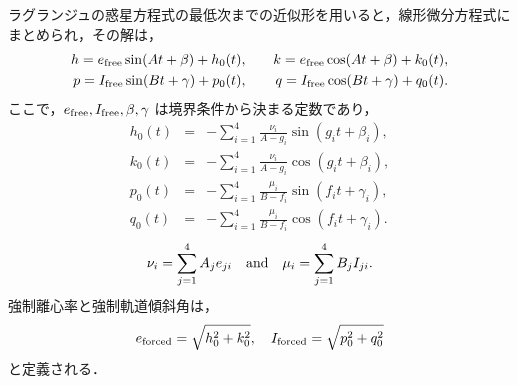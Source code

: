 \documentclass[11pt,a4paper,oneside,onecolumn]{jreport}
\begin{document}
ラグランジュの惑星方程式の最低次までの近似形を用いると，線形微分方程式にまとめられ，その解は，
\begin{eqnarray}
h = e_{\rm free} \sin (A t + \beta) + h_0 (t), & \quad & k = e_{\rm free} \cos (A t + \beta) + k_0 (t), \label{eq:hk_solution} \\
p = I_{\rm free} \sin (B t + \gamma) + p_0 (t), & \quad & q = I_{\rm free} \cos (B t + \gamma) + q_0 (t). \label{eq:pq_solution}
\end{eqnarray}
ここで，$e_{\rm free}, I_{\rm free}, \beta, \gamma$ は境界条件から決まる定数であり，
\begin{eqnarray}
h_0 (t) & = & - \sum_{i = 1}^4 \frac{\nu_i}{A - g_i} \sin (g_i t + \beta_i), \label{eq:h_0_4planet} \\
k_0 (t) & = & - \sum_{i = 1}^4 \frac{\nu_i}{A - g_i} \cos (g_i t + \beta_i), \label{eq:k_0_4planet} \\
p_0 (t) & = & - \sum_{i = 1}^4 \frac{\mu_i}{B - f_i} \sin (f_i t + \gamma_i), \label{eq:p_0_4planet} \\
q_0 (t) & = & - \sum_{i = 1}^4 \frac{\mu_i}{B - f_i} \cos (f_i t + \gamma_i). \label{eq:q_0_4planet}
\end{eqnarray}
\begin{equation}
\nu_i = \sum_{j = 1}^4 A_j e_{ji} \quad {\rm and} \quad \mu_i = \sum_{j=1}^4 B_j I_{ji}. \label{eq:nu_mu_4planet}
\end{equation}
強制離心率と強制軌道傾斜角は，
\begin{equation}
e_{\rm forced} = \sqrt{h_0^2 + k_0^2}, \quad I_{\rm forced} = \sqrt{p_0^2 + q_0^2} \label{eq:forced}
\end{equation}
と定義される．
\end{document}
